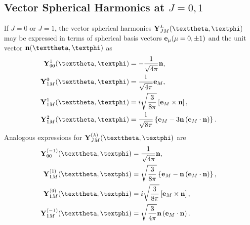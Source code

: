 \subsection{Vector Spherical Harmonics at $J=0,1$}\label{sec:7.3.16}
If $J=0$ or $J=1$, the vector spherical harmonics $\vect{Y}_{J M}^{L}(\vartheta, \varphi)$ may be expressed in terms of spherical basis vectors $\mathbf{e}_{\mu}(\mu=0, \pm 1)$ and the unit vector $\vect{n}(\vartheta, \varphi)$ as
\begin{align}
\vect{Y}_{00}^{1}(\vartheta, \varphi) & =-\frac{1}{\sqrt{4 \pi}} \vect{n},  \label{eq:7:3:146}\\
\vect{Y}_{1 M}^{0}(\vartheta, \varphi) & =\frac{1}{\sqrt{4 \pi}} \vect{e}_{M} , \label{eq:7:3:147}\\
\vect{Y}_{1 M}^{1}(\vartheta, \varphi) & =i \sqrt{\frac{3}{8 \pi}}\left[\vect{e}_{M} \times \vect{n}\right], \label{eq:7:3:148}\\
\vect{Y}_{1 M}^{2}(\vartheta, \varphi) & =\frac{1}{\sqrt{8 \pi}}\left\{\vect{e}_{M}-3 \vect{n}\left(\vect{e}_{M} \cdot \vect{n}\right)\right\}. \label{eq:7:3:149}
\end{align}
Analogous expressions for $\vect{Y}_{J M}^{(\lambda)}(\vartheta, \varphi)$ are
\begin{align}
\vect{Y}_{00}^{(-1)}(\vartheta, \varphi) & =\frac{1}{\sqrt{4 \pi}} \vect{n},  \label{eq:7:3:150}\\
\vect{Y}_{1 M}^{(1)}(\vartheta, \varphi) & =\sqrt{\frac{3}{8 \pi}}\left\{\vect{e}_{M}-\vect{n}\left(\vect{e}_{M} \cdot \vect{n}\right)\right\} , \label{eq:7:3:151}\\
\vect{Y}_{1 M}^{(0)}(\vartheta, \varphi) & =i \sqrt{\frac{3}{8 \pi}}\left[\vect{e}_{M} \times \vect{n}\right] , \label{eq:7:3:152}\\
\vect{Y}_{1 M}^{(-1)}(\vartheta, \varphi) & =\sqrt{\frac{3}{4 \pi}} \vect{n}\left(\vect{e}_{M} \cdot \vect{n}\right). \label{eq:7:3:153}
\end{align}
